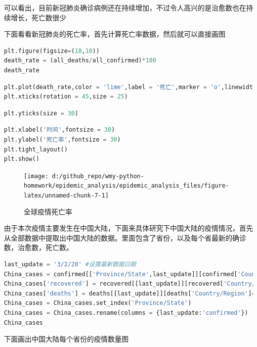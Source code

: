 \documentclass[UTF8,a4paper,12pt]{ctexart}  %
\begin{document}
可以看出，目前新冠肺炎确诊病例还在持续增加，不过令人高兴的是治愈数也在持续增长，死亡数很少

下面看看新冠肺炎的死亡率，首先计算死亡率数据，然后就可以直接画图

\begin{lstlisting}[language=Python]
plt.figure(figsize=(18,10))
death_rate = (all_deaths/all_confirmed)*100
death_rate
\end{lstlisting}

\begin{lstlisting}[language=Python]
plt.plot(death_rate,color = 'lime',label = '死亡',marker = 'o',linewidth=2,markersize=3)
plt.xticks(rotation = 45,size = 25)
\end{lstlisting}

\begin{lstlisting}[language=Python]
plt.yticks(size = 30)
\end{lstlisting}

\begin{lstlisting}[language=Python]
plt.xlabel('时间',fontsize = 30)
plt.ylabel('死亡率',fontsize = 30)
plt.tight_layout()
plt.show()
\end{lstlisting}

\begin{figure}

{\centering \texttt{[image: d:/github\_repo/wmy-python-homework/epidemic\_analysis/epidemic\_analysis\_files/figure-latex/unnamed-chunk-7-1]} 

}

\caption{全球疫情死亡率}\label{fig:unnamed-chunk-7}
\end{figure}

由于本次疫情主要发生在中国大陆，下面来具体研究下中国大陆的疫情情况，首先从全部数据中提取出中国大陆的数据。里面包含了省份，以及每个省最新的确诊数，治愈数，死亡数。

\begin{lstlisting}[language=Python]
last_update = '3/2/20' #设置最新数据日期
China_cases = confirmed[['Province/State',last_update]][confirmed['Country/Region']=='Mainland China']
China_cases['recovered'] = recovered[[last_update]][recovered['Country/Region']=='Mainland China']
China_cases['deaths'] = deaths[[last_update]][deaths['Country/Region']=='Mainland China']
China_cases = China_cases.set_index('Province/State')
China_cases = China_cases.rename(columns = {last_update:'confirmed'})
China_cases
\end{lstlisting}

下面画出中国大陆每个省份的疫情数量图
\end{document}
